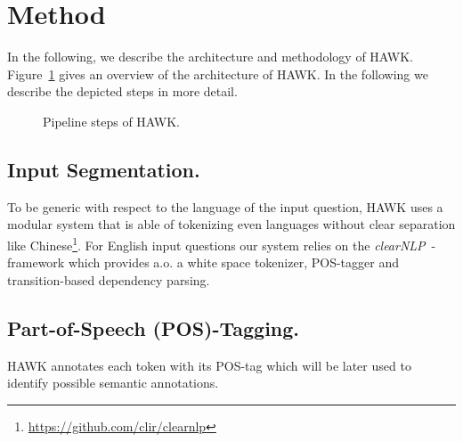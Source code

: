 \section{Method}
\label{chahawk:sec:method}

In the following, we describe the architecture and methodology of HAWK. 
Figure~\ref{fig:hawk_pipeline} gives an overview of the architecture of HAWK. In the following we describe the depicted steps in more detail.%

\begin{figure}[tb!]
\centering

\caption{Pipeline steps of HAWK.}
\label{fig:hawk_pipeline}
\end{figure}

\subsection{Input Segmentation.} 
To be generic with respect to the language of the input question, HAWK uses a modular system that is able of tokenizing even languages without clear separation like Chinese\footnote{\url{https://github.com/clir/clearnlp}}.
For English input questions our system relies on the \emph{clearNLP}~\cite{choi2011getting}-framework which provides a.o. a white space tokenizer, POS-tagger and transition-based dependency parsing.

\subsection{Part-of-Speech (POS)-Tagging.} 
HAWK annotates each token with its POS-tag which will be later used to identify possible semantic annotations. 


